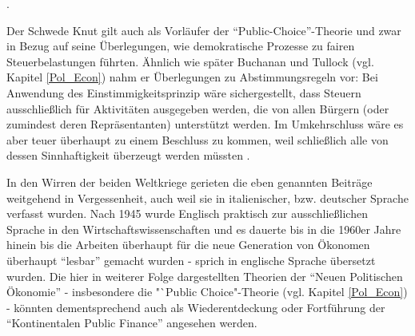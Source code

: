 \parencite[S. 16]{Backhaus2005}. 
	
Der Schwede Knut \textcite{Wicksell1896} gilt auch als Vorläufer der "`Public-Choice"'-Theorie und zwar in Bezug auf seine Überlegungen, wie demokratische Prozesse zu fairen Steuerbelastungen führten. Ähnlich wie später Buchanan und Tullock (vgl. Kapitel \ref{Pol_Econ}) nahm er Überlegungen zu Abstimmungsregeln vor: Bei Anwendung des Einstimmigkeitsprinzip wäre sichergestellt, dass Steuern ausschließlich für Aktivitäten ausgegeben werden, die von allen Bürgern (oder zumindest deren Repräsentanten) unterstützt werden. Im Umkehrschluss wäre es aber teuer überhaupt zu einem Beschluss zu kommen, weil schließlich alle von dessen Sinnhaftigkeit überzeugt werden müssten \parencite[S. 20]{Backhaus2005}.
	
In den Wirren der beiden Weltkriege gerieten die eben genannten Beiträge weitgehend in Vergessenheit, auch weil sie in italienischer, bzw. deutscher Sprache verfasst wurden. Nach 1945 wurde Englisch praktisch zur ausschließlichen Sprache in den Wirtschaftswissenschaften und es dauerte bis in die 1960er Jahre hinein bis die Arbeiten überhaupt für die neue Generation von Ökonomen überhaupt "`lesbar"' gemacht wurden - sprich in englische Sprache übersetzt wurden. Die hier in weiterer Folge dargestellten Theorien der "`Neuen Politischen Ökonomie"' - insbesondere die "`Public Choice"-Theorie (vgl. Kapitel \ref{Pol_Econ}) - könnten dementsprechend auch als Wiederentdeckung oder Fortführung der "`Kontinentalen Public Finance"' angesehen werden.

